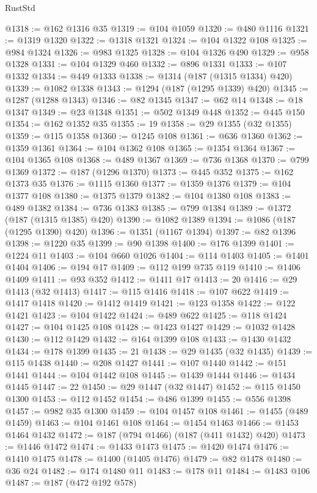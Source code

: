 \begin{lexlean}{RustStd}
\begin{coremodule}
@1318 := @162 @1316 @35
@1319 := @104 @1059
@1320 := @480 @1116
@1321 := @1319 @1320
@1322 := @1318 @1321
@1324 := @104 @1322 @108
@1325 := @984 @1324
@1326 := @983 @1325
@1328 := @104 @1326 @490
@1329 := @958 @1328
@1331 := @104 @1329 @460
@1332 := @896 @1331
@1333 := @107 @1332
@1334 := @449 @1333
@1338 := @1314 (@187 (@1315 @1334) @420)
@1339 := @1082 @1338
@1343 := @1294 (@187 (@1295 @1339) @420)
@1345 := @1287 (@1288 @1343)
@1346 := @82 @1345
@1347 := @62 @14
@1348 := @18 @1347
@1349 := @23 @1348
@1351 := @502 @1349 @448
@1352 := @445 @150
@1354 := @162 @1352 @35
@1355 := 19
@1358 := @29 @1355 (@32 @1355)
@1359 := @115 @1358
@1360 := @1245 @108
@1361 := @636 @1360
@1362 := @1359 @1361
@1364 := @104 @1362 @108
@1365 := @1354 @1364
@1367 := @104 @1365 @108
@1368 := @489 @1367
@1369 := @736 @1368
@1370 := @799 @1369
@1372 := @187 (@1296 @1370)
@1373 := @445 @352
@1375 := @162 @1373 @35
@1376 := @1115 @1360
@1377 := @1359 @1376
@1379 := @104 @1377 @108
@1380 := @1375 @1379
@1382 := @104 @1380 @108
@1383 := @489 @1382
@1384 := @736 @1383
@1385 := @799 @1384
@1389 := @1372 (@187 (@1315 @1385) @420)
@1390 := @1082 @1389
@1394 := @1086 (@187 (@1295 @1390) @420)
@1396 := @1351 (@1167 @1394)
@1397 := @82 @1396
@1398 := @1220 @35
@1399 := @90 @1398
@1400 := @176 @1399
@1401 := @1224 @11
@1403 := @104 @660 @1026
@1404 := @114 @1403
@1405 := @1401 @1404
@1406 := @194 @17
@1409 := @112 @199 @735 @119
@1410 := @1406 @1409
@1411 := @93 @352
@1412 := @1411 @17
@1413 := 20
@1416 := @29 @1413 (@32 @1413)
@1417 := @115 @1416
@1418 := @107 @622
@1419 := @1417 @1418
@1420 := @1412 @1419
@1421 := @123 @1358
@1422 := @122 @1421
@1423 := @104 @1422
@1424 := @489 @622
@1425 := @118 @1424
@1427 := @104 @1425 @108
@1428 := @1423 @1427
@1429 := @1032 @1428
@1430 := @112 @1429
@1432 := @164 @1399 @108
@1433 := @1430 @1432
@1434 := @178 @1399
@1435 := 21
@1438 := @29 @1435 (@32 @1435)
@1439 := @115 @1438
@1440 := @208 @1427
@1441 := @107 @1440
@1442 := @151 @1441
@1444 := @104 @1442 @108
@1445 := @1439 @1444
@1446 := @1434 @1445
@1447 := 22
@1450 := @29 @1447 (@32 @1447)
@1452 := @115 @1450 @1300
@1453 := @112 @1452
@1454 := @486 @1399
@1455 := @556 @1398
@1457 := @982 @35 @1300
@1459 := @104 @1457 @108
@1461 := @1455 (@489 @1459)
@1463 := @104 @1461 @108
@1464 := @1454 @1463
@1466 := @1453 @1464 @1432
@1472 := @187 (@794 @1466) (@187 (@411 @1432) @420)
@1473 := @1446 @1472
@1474 := @1433 @1473
@1475 := @1420 @1474
@1476 := @1410 @1475
@1478 := @1400 (@1405 @1476)
@1479 := @82 @1478
@1480 := @36 @24
@1482 := @174 @1480 @11
@1483 := @178 @11
@1484 := @1483 @106
@1487 := @187 (@472 @192 @578)

\end{coremodule}
\end{lexlean}
